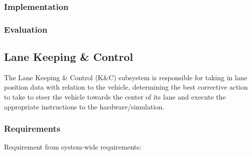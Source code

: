 \documentclass[titlepage]{article}
\begin{document}
\subsubsection{Implementation}
\subsubsection{Evaluation}

\subsection{Lane Keeping \& Control}
The Lane Keeping \& Control (K\&C) subsystem is responsible for taking in lane position data with relation to the vehicle, determining the best corrective action to take to steer the vehicle towards the center of its lane and execute the appropriate instructions to the hardware/simulation.

\subsubsection{Requirements}
Requirement from system-wide requirements:
\end{document}
